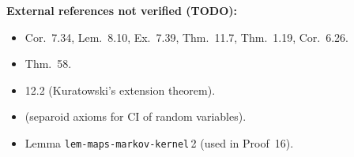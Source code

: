 \documentclass{article}
\begin{document}
\bigskip\noindent
\textbf{External references not verified (TODO):}
\begin{itemize}
  \item \cite{Kle20} Cor.\ 7.34, Lem.\ 8.10, Ex.\ 7.39, Thm.\ 11.7, Thm.\ 1.19, Cor.\ 6.26.
  \item \cite{Del83} Thm.\ 58.
  \item \cite{Kec95} 12.2 (Kuratowski's extension theorem).
  \item \cite{Daw01} (separoid axioms for CI of random variables).
  \item Lemma \texttt{lem-maps-markov-kernel}\,2 (used in Proof~16).
\end{itemize}
\end{document}
